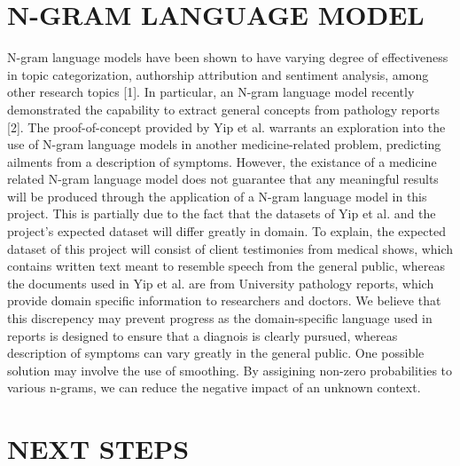 \documentclass[12pt, final, onecolumn, comsoc, conference]{IEEEtran}
\begin{document}
\section{\MakeTextUppercase{N-Gram Language Model}}
N-gram language models have been shown to have varying degree of effectiveness in topic categorization,
authorship attribution and sentiment analysis, among other research topics [1]. In particular, an N-gram language
model recently demonstrated the capability to extract general concepts from pathology reports [2].
The proof-of-concept provided by Yip et al. warrants an exploration into the use of N-gram language models
in another medicine-related problem, predicting ailments from a description of symptoms.
However, the existance of a medicine related N-gram language model does not guarantee that any
meaningful results will be produced through the application of a N-gram language model in this project.
This is partially due to the fact that the datasets of Yip et al. and the project's expected dataset will differ greatly in domain.
To explain, the expected dataset of this project will consist of client testimonies from medical shows,
which contains written text meant to resemble speech from the general public,
whereas the documents used in Yip et al. are from University pathology reports,
which provide domain specific information to researchers and doctors.
We believe that this discrepency may prevent progress as the domain-specific language used in reports
is designed to ensure that a diagnois is clearly pursued, whereas description of symptoms can vary greatly
in the general public. One possible solution may involve the use of smoothing. By assigining non-zero
probabilities to various n-grams, we can reduce the negative impact of an unknown context.  


\section{\MakeUppercase{Next Steps}}
\end{document}
